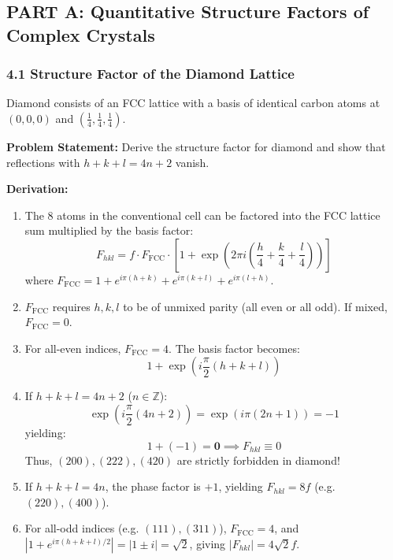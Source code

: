 \documentclass[11pt,a4paper]{article}
\begin{document}
\subsection{PART A: Quantitative Structure Factors of Complex Crystals}

\subsubsection{4.1 Structure Factor of the Diamond Lattice}
Diamond consists of an FCC lattice with a basis of identical carbon atoms at $(0,0,0)$ and $\left(\frac{1}{4}, \frac{1}{4}, \frac{1}{4}\right)$.

\begin{solbox}
\textbf{Problem Statement:} Derive the structure factor for diamond and show that reflections with $h+k+l = 4n+2$ vanish.

\textbf{Derivation:}
\begin{enumerate}
    \item The 8 atoms in the conventional cell can be factored into the FCC lattice sum multiplied by the basis factor:
    \begin{equation}
    F_{hkl} = f \cdot F_{\text{FCC}} \cdot \left[ 1 + \exp\left(2\pi i\left(\frac{h}{4} + \frac{k}{4} + \frac{l}{4}\right)\right) \right]
    \end{equation}
    where $F_{\text{FCC}} = 1 + e^{i\pi(h+k)} + e^{i\pi(k+l)} + e^{i\pi(l+h)}$.
    \item $F_{\text{FCC}}$ requires $h, k, l$ to be of unmixed parity (all even or all odd). If mixed, $F_{\text{FCC}} = 0$.
    \item For all-even indices, $F_{\text{FCC}} = 4$. The basis factor becomes:
    \begin{equation}
    1 + \exp\left(i\frac{\pi}{2}(h+k+l)\right)
    \end{equation}
    \item If $h+k+l = 4n+2$ ($n \in \mathbb{Z}$):
    \begin{equation}
    \exp\left(i\frac{\pi}{2}(4n+2)\right) = \exp(i\pi(2n+1)) = -1
    \end{equation}
    yielding:
    \begin{equation}
    1 + (-1) = \mathbf{0} \implies F_{hkl} \equiv 0
    \end{equation}
    Thus, $(200), (222), (420)$ are strictly forbidden in diamond!
    \item If $h+k+l = 4n$, the phase factor is $+1$, yielding $F_{hkl} = 8f$ (e.g. $(220), (400)$).
    \item For all-odd indices (e.g. $(111), (311)$), $F_{\text{FCC}} = 4$, and $|1 + e^{i\pi(h+k+l)/2}| = |1 \pm i| = \sqrt{2}$, giving $|F_{hkl}| = 4\sqrt{2}f$.
\end{enumerate}
\end{solbox}
\end{document}
